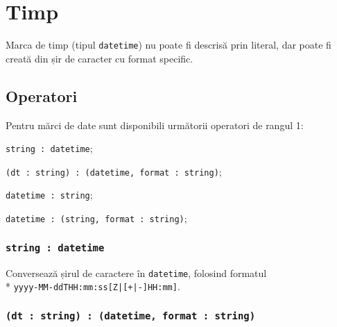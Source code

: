 \section{Timp}

Marca de timp (tipul \texttt{datetime}) nu poate fi descrisă prin literal, dar poate fi creată din șir de caracter cu format specific.

\subsection{Operatori}

Pentru mărci de date sunt disponibili următorii operatori de rangul 1:
\begin{icItems}
	\item \texttt{string : datetime};
	\item \texttt{(dt : string) : (datetime, format : string)};
	\item \texttt{datetime : string};
	\item \texttt{datetime : (string, format : string)};
\end{icItems}

\subsubsection{\texttt{string : datetime}}

Conversează șirul de caractere în \texttt{datetime}, folosind formatul \\* \texttt{yyyy-MM-ddTHH:mm:ss[Z|[+|-]HH:mm]}.

\subsubsection{\texttt{(dt : string) : (datetime, format : string)}}


